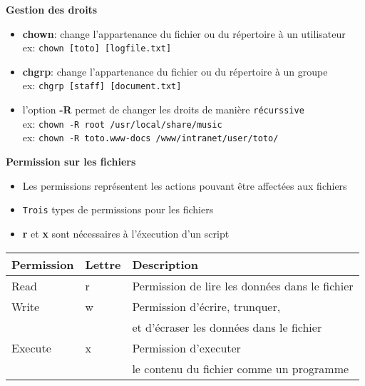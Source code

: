 \documentclass[french]{beamer}
\begin{document}
\begin{frame}
\textbf{Gestion des droits}
    \begin{itemize}
    \item \textbf{chown}: change l'appartenance du fichier ou du répertoire  à
    un utilisateur\\
    ex: \texttt{chown [toto] [logfile.txt]}
    \item \textbf{chgrp}: change l'appartenance du fichier ou du répertoire à
    un groupe \\
    ex: \texttt{chgrp [staff] [document.txt]}
    \item l'option \textbf{-R} permet de changer les droits de manière
    \texttt{récurssive} \\
    ex: \texttt{chown -R root /usr/local/share/music} \\
    ex: \texttt{chown -R toto.www-docs  /www/intranet/user/toto/}
    \end{itemize}
\end{frame}


\begin{frame}
\textbf{Permission sur les fichiers}
\begin{itemize}
\item Les permissions représentent les actions pouvant être affectées aux fichiers
\item \texttt{Trois} types de permissions pour les fichiers
\item \textbf{r} et \textbf{x} sont nécessaires à l'éxecution d'un script
\end{itemize}
\begin{tabular}{|l|l|l|}
   \hline
   \textbf{Permission} & \textbf{Lettre} & \textbf{Description} \\
   \hline
   Read & r & Permission de lire les données dans le fichier \\
   Write & w & Permission d'écrire, trunquer,\\ 
   & & et d'écraser les données dans le fichier \\
   Execute & x & Permission d'executer \\
   & & le contenu du fichier comme un programme\\
   \hline
\end{tabular}
\end{frame}
\end{document}
